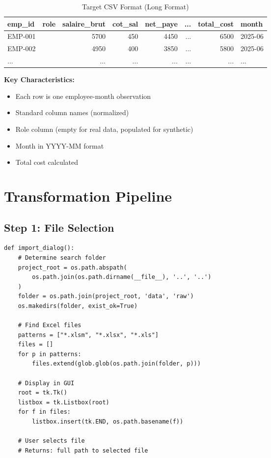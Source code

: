 \begin{table}[H]
\centering
\footnotesize
\begin{tabular}{|l|l|r|r|r|r|r|l|}
\hline
\textbf{emp\_id} & \textbf{role} & \textbf{salaire\_brut} & \textbf{cot\_sal} & \textbf{net\_paye} & ... & \textbf{total\_cost} & \textbf{month} \\
\hline
EMP-001 & & 5700 & 450 & 4450 & ... & 6500 & 2025-06 \\
EMP-002 & & 4950 & 400 & 3850 & ... & 5800 & 2025-06 \\
... & & ... & ... & ... & ... & ... & ... \\
\hline
\end{tabular}
\caption{Target CSV Format (Long Format)}
\end{table}

\textbf{Key Characteristics:}
\begin{itemize}
    \item Each row is one employee-month observation
    \item Standard column names (normalized)
    \item Role column (empty for real data, populated for synthetic)
    \item Month in YYYY-MM format
    \item Total cost calculated
\end{itemize}

\section{Transformation Pipeline}

\subsection{Step 1: File Selection}

\begin{lstlisting}[style=pythonstyle, caption=File Selection Logic]
def import_dialog():
    # Determine search folder
    project_root = os.path.abspath(
        os.path.join(os.path.dirname(__file__), '..', '..')
    )
    folder = os.path.join(project_root, 'data', 'raw')
    os.makedirs(folder, exist_ok=True)
    
    # Find Excel files
    patterns = ["*.xlsm", "*.xlsx", "*.xls"]
    files = []
    for p in patterns:
        files.extend(glob.glob(os.path.join(folder, p)))
    
    # Display in GUI
    root = tk.Tk()
    listbox = tk.Listbox(root)
    for f in files:
        listbox.insert(tk.END, os.path.basename(f))
    
    # User selects file
    # Returns: full path to selected file
\end{lstlisting}

